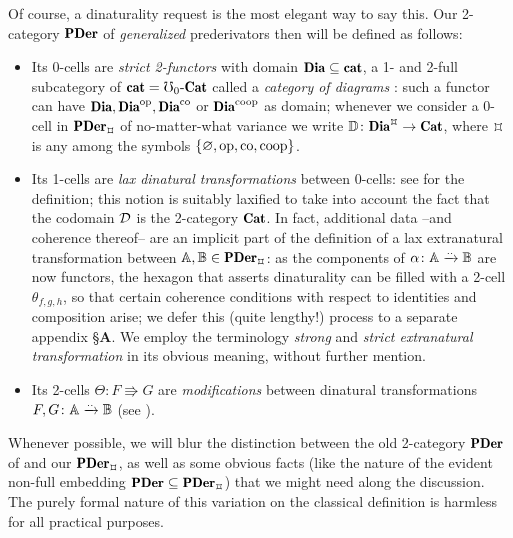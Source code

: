 Of course, a dinaturality request \cite{} is the most elegant way to say this. Our 2-category $\PDer$ of \emph{generalized} prederivators then will be defined as follows:
\begin{itemize}
  \item Its 0-cells are \emph{strict 2-functors} with domain $\Dia \subseteq \ct$, a 1- and 2-full subcategory of $\ct = \mho_0\text{-}\Cat$ called a \emph{category of diagrams} \cite[???]{maltsiniotis2007k}: such a functor can have $\Dia, \Dia^\opp,\Dia^\co$ or $\Dia^\coop$ as domain; whenever we consider a 0-cell in $\PDer_\smlerp$ of no-matter-what variance we write $\D \colon \Dia^\smlerp \to \Cat$, where $\smlerp$ is any among the symbols $\{\varnothing, \text{op},\text{co},\text{co}\text{op}\}$.
  \item Its 1-cells are \emph{lax dinatural transformations} between 0-cells: see \adef{} for the definition; this notion is suitably laxified to take into account the fact that the codomain $\mathcal{D}$ is the 2-category $\Cat$. In fact, additional data --and coherence thereof-- are an implicit part of the definition of a lax extranatural transformation between $\derA,\derB \in\PDer_\smlerp$: as the components of $\alpha \colon \mathbb{A} \xrightarrow{..} \mathbb{B}$ are now functors, the hexagon that asserts dinaturality can be filled with a 2-cell $\theta_{f,g,h}$, so that certain coherence conditions with respect to identities and composition arise; we defer this (quite lengthy!) process to a separate appendix §\textbf{A}. We employ the terminology \emph{strong} and \emph{strict extranatural transformation} in its obvious meaning, without further mention.
  \item Its 2-cells $\Theta \colon F \Rrightarrow G$ are \emph{modifications} between dinatural transformations $F,G \colon \mathbb{A} \xrightarrow{..} \mathbb{B}$ (see \adef{}).
\end{itemize} 
Whenever possible, we will blur the distinction between the old 2-category $\PDer$ of \cite{groth2013derivators} and our $\PDer_\smlerp$, as well as some obvious facts (like the nature of the evident non-full embedding $\PDer \subseteq \PDer_\smlerp$) that we might need along the discussion. The purely formal nature of this variation on the classical definition is harmless for all practical purposes.

